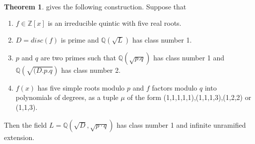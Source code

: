 \documentclass[12pt]{extarticle}
\newcommand{\Q}{\mathbb{Q}}
\newcommand{\Z}{\mathbb{Z}}
\newcommand{\<}{\langle}
\renewcommand{\>}{\rangle}
\theoremstyle{definition}
\newtheorem{theorem}{Theorem}
\begin{document}
\
\begin{theorem}

\cite{BRINK} gives the following construction. Suppose that \begin{enumerate}
    \item $f\in \Z[x]$ is an irreducible quintic with five real roots.
    \item $D = disc(f)$ is prime and $\Q(\sqrt{L})$ has class number 1.
    \item $p$ and $q$ are two primes such that $\Q(\sqrt{p.q})$ has class number 1 and $\Q\left(\sqrt{(D.p.q}\right)$ has class number 2.
    \item $f(x)$ has five simple roots modulo $p$ and $f$ factors modulo $q$ into polynomials of degrees, as a tuple $\mu$ of the form (1,1,1,1,1),(1,1,1,3),(1,2,2) or (1,1,3).
\end{enumerate}
Then the field $L=\Q\left(\sqrt{D},\sqrt{p \cdot q}\right)$ has class number 1 and infinite unramified extension.
\end{theorem}
\end{document}
